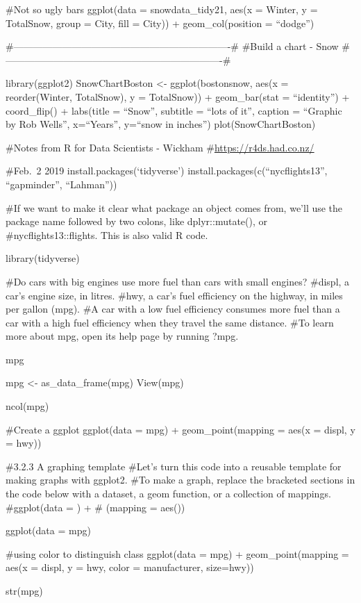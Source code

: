 \documentclass[]{book}
\begin{document}
\#Not so ugly bars
ggplot(data = snowdata\_tidy21, aes(x = Winter, y = TotalSnow, group = City, fill = City)) +
geom\_col(position = ``dodge'')

\#-------------------------------------------------------------------\#
\#Build a chart - Snow
\#-------------------------------------------------------------------\#

library(ggplot2)
SnowChartBoston \textless{}- ggplot(bostonsnow, aes(x = reorder(Winter, TotalSnow), y = TotalSnow)) +
geom\_bar(stat = ``identity'') +
coord\_flip() +
labs(title = ``Snow'',
subtitle = ``lots of it'',
caption = ``Graphic by Rob Wells'',
x=``Years'',
y=``snow in inches'')
plot(SnowChartBoston)

\#Notes from R for Data Scientists - Wickham
\#\url{https://r4ds.had.co.nz/}

\#Feb.~2 2019
install.packages(`tidyverse')
install.packages(c(``nycflights13'', ``gapminder'', ``Lahman''))

\#If we want to make it clear what package an object comes from, we'll use the package name followed by two colons, like dplyr::mutate(), or
\#nycflights13::flights. This is also valid R code.

library(tidyverse)

\#Do cars with big engines use more fuel than cars with small engines?
\#displ, a car's engine size, in litres.
\#hwy, a car's fuel efficiency on the highway, in miles per gallon (mpg).
\#A car with a low fuel efficiency consumes more fuel than a car with a high fuel efficiency when they travel the same distance.
\#To learn more about mpg, open its help page by running ?mpg.

mpg

mpg \textless{}- as\_data\_frame(mpg)
View(mpg)

ncol(mpg)

\#Create a ggplot
ggplot(data = mpg) +
geom\_point(mapping = aes(x = displ, y = hwy))

\#3.2.3 A graphing template
\#Let's turn this code into a reusable template for making graphs with ggplot2.
\#To make a graph, replace the bracketed sections in the code below with a dataset, a geom function, or a collection of mappings.
\#ggplot(data = ) +
\# (mapping = aes())

ggplot(data = mpg)

\#using color to distinguish class
ggplot(data = mpg) +
geom\_point(mapping = aes(x = displ, y = hwy, color = manufacturer, size=hwy))

str(mpg)
\end{document}
